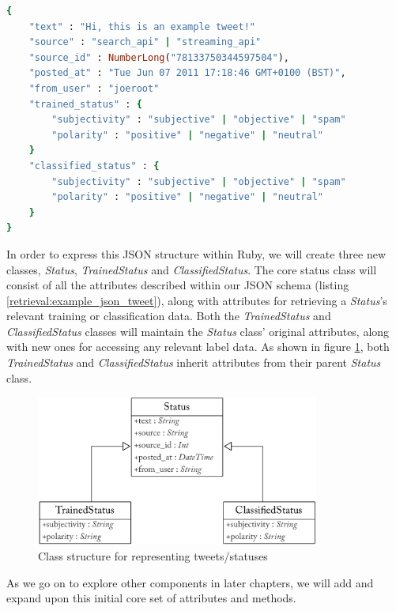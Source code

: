 \begin{lstlisting}[language=Ruby, caption={Basic JSON structure for status objects stored in MongoDB}, label=retrieval:example_json_tweet]
{
	"text" : "Hi, this is an example tweet!"
	"source" : "search_api" | "streaming_api"
	"source_id" : NumberLong("78133750344597504"),
	"posted_at" : "Tue Jun 07 2011 17:18:46 GMT+0100 (BST)",
	"from_user" : "joeroot"
	"trained_status" : {
		"subjectivity" : "subjective" | "objective" | "spam"
		"polarity" : "positive" | "negative" | "neutral"
	}
	"classified_status" : {
		"subjectivity" : "subjective" | "objective" | "spam"
		"polarity" : "positive" | "negative" | "neutral"
	}
}
\end{lstlisting}

In order to express this JSON structure within Ruby, we will create three new classes, \emph{Status}, \emph{TrainedStatus} and \emph{ClassifiedStatus}. The core status class will consist of all the attributes described within our JSON schema (listing \ref{retrieval:example_json_tweet}), along with attributes for retrieving a \emph{Status}'s relevant training or classification data. Both the \emph{TrainedStatus} and \emph{ClassifiedStatus} classes will maintain the \emph{Status} class' original attributes, along with new ones for accessing any relevant label data. As shown in figure \ref{fig:status_uml}, both \emph{TrainedStatus} and \emph{ClassifiedStatus} inherit attributes from their parent \emph{Status} class.

\begin{figure}
	\caption{Class structure for representing tweets/statuses}
	\label{fig:status_uml}
	\centering
	\includegraphics[width=0.83\textwidth]{figures/status_uml_class_diagram.pdf}
\end{figure}

As we go on to explore other components in later chapters, we will add and expand upon this initial core set of attributes and methods. 

